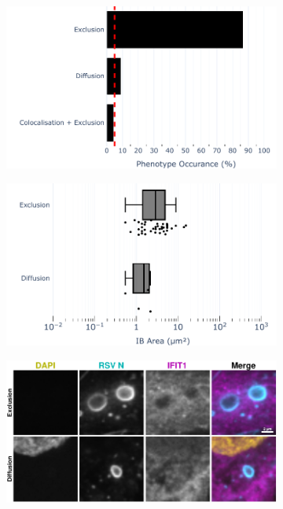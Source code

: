 \begin{figure}
    \begin{subfigure}{0.5\textwidth}
        \caption{}
        \includegraphics[width=1\linewidth]{09. Chapter 4/Figs/02. Infection/01. IFIT1/04. bar_i1_beas2b.pdf} 
    \end{subfigure}
    \begin{subfigure}{0.5\textwidth}
        \caption{}
        \includegraphics[width=1\linewidth]{09. Chapter 4/Figs/02. Infection/01. IFIT1/05. box_i1_beas2b.pdf}
    \end{subfigure}
    \begin{subfigure}{1\textwidth}
        \centering
        \caption{}
        \includegraphics[width=1\linewidth]{09. Chapter 4/Figs/02. Infection/01. IFIT1/06. beas2b i1.pdf}

\end{subfigure}
\end{figure}
